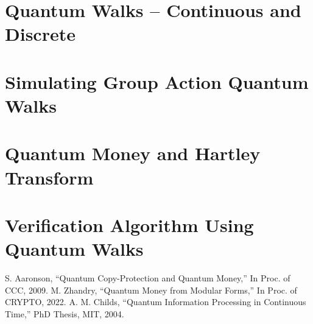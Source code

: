 \documentclass[12pt]{report}
\begin{document}
\chapter{Quantum Walks -- Continuous and Discrete}







\chapter{Simulating Group Action Quantum Walks}



\chapter{Quantum Money and Hartley Transform}





\chapter{Verification Algorithm Using Quantum Walks}






\begin{thebibliography}{99}
 S. Aaronson, ``Quantum Copy-Protection and Quantum Money,'' In Proc. of CCC, 2009.
 M. Zhandry, ``Quantum Money from Modular Forms,'' In Proc. of CRYPTO, 2022.
 A. M. Childs, ``Quantum Information Processing in Continuous Time,'' PhD Thesis, MIT, 2004.
\end{thebibliography}
\end{document}
